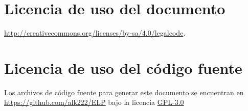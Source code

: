 \chapter*{Licencia de uso del documento}

\begin{flushright}

    \doclicenseThis

    \url{http://creativecommons.org/licenses/by-sa/4.0/legalcode}.
\end{flushright}

\chapter*{Licencia de uso del código fuente}

Los archivos de código fuente para generar este documento se encuentran en \url{https://github.com/alk222/ELP} bajo la licencia \href{https://www.gnu.org/licenses/gpl-3.0.html}{GPL-3.0}
